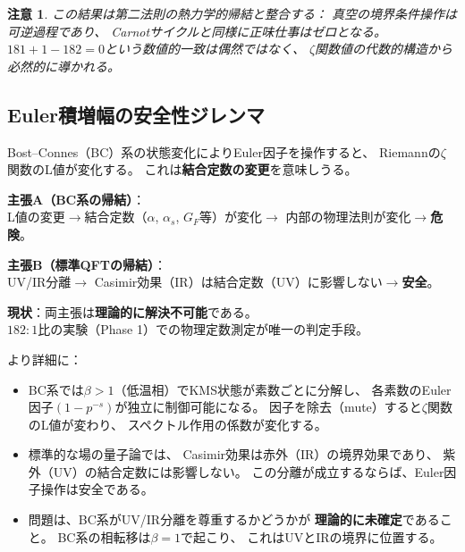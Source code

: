 \documentclass[11pt,a4paper]{article}
\newtheorem{remark}[theorem]{注意}
\begin{document}
\begin{remark}
この結果は第二法則の熱力学的帰結と整合する：
真空の境界条件操作は可逆過程であり、
Carnotサイクルと同様に正味仕事はゼロとなる。
$181 + 1 - 182 = 0$という数値的一致は偶然ではなく、
$\zeta$関数値の代数的構造から必然的に導かれる。
\end{remark}


\subsection{Euler積増幅の安全性ジレンマ}
\label{sec:14.3}

Bost--Connes（BC）系の状態変化によりEuler因子を操作すると、
Riemannの$\zeta$関数のL値が変化する。
これは\textbf{結合定数の変更}を意味しうる。

\begin{tcolorbox}[colback=yellow!5!white, colframe=yellow!70!black, title=安全性ジレンマ：未解決問題]
\textbf{主張A（BC系の帰結）}：\\
L値の変更$\to$結合定数（$\alpha$, $\alpha_s$, $G_F$等）が変化$\to$
内部の物理法則が変化$\to$\textbf{危険}。

\vspace{0.5em}
\textbf{主張B（標準QFTの帰結）}：\\
UV/IR分離$\to$ Casimir効果（IR）は結合定数（UV）に影響しない$\to$\textbf{安全}。

\vspace{0.5em}
\textbf{現状}：両主張は\textbf{理論的に解決不可能}である。\\
$182:1$比の実験（Phase 1）での物理定数測定が唯一の判定手段。
\end{tcolorbox}

\noindent
より詳細に：
\begin{itemize}
\item BC系では$\beta > 1$（低温相）でKMS状態が素数ごとに分解し、
各素数のEuler因子$(1 - p^{-s})$が独立に制御可能になる。
因子を除去（mute）すると$\zeta$関数のL値が変わり、
スペクトル作用の係数が変化する。

\item 標準的な場の量子論では、
Casimir効果は赤外（IR）の境界効果であり、
紫外（UV）の結合定数には影響しない。
この分離が成立するならば、Euler因子操作は安全である。

\item 問題は、BC系がUV/IR分離を尊重するかどうかが
\textbf{理論的に未確定}であること。
BC系の相転移は$\beta = 1$で起こり、
これはUVとIRの境界に位置する。
\end{itemize}
\end{document}
